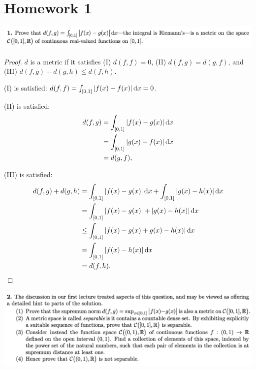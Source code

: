 \section{Homework 1}

\begin{mdframed}
  \includegraphics[width=400pt]{img/analysis--berkeley-202a--homework-1-a75a.png}
\end{mdframed}


\begin{proof}
  $d$ is a metric if it satisfies (I) $d(f,f) = 0$, (II) $d(f,g) = d(g, f)$, and (III) $d(f,g) + d(g, h) \le d(f, h)$.

  (I) is satisfied: $d(f, f) = \int_{[0,1]}|f(x) - f(x)| \dx = 0$.

  (II) is satisfied:
  \begin{align*}
    d(f, g)
    &= \int_{[0,1]}|f(x) - g(x)| \dx \\
    &= \int_{[0,1]}|g(x) - f(x)| \dx \\
    &= d(g, f),
  \end{align*}

  (III) is satisfied:
  \begin{align*}
    d(f, g) + d(g, h)
    &= \int_{[0,1]} |f(x) - g(x)| \dx + \int_{[0,1]} |g(x) - h(x)| \dx \\
    &= \int_{[0,1]} |f(x) - g(x)| + |g(x) - h(x)| \dx \\
    &\le \int_{[0,1]} |f(x) - g(x) + g(x) - h(x)| \dx \\
    &= \int_{[0,1]} |f(x) - h(x)| \dx \\
    &= d(f, h).
  \end{align*}
\end{proof}

\newpage
\begin{mdframed}
  \includegraphics[width=400pt]{img/analysis--berkeley-202a--homework-1-d1d3.png}
\end{mdframed}

